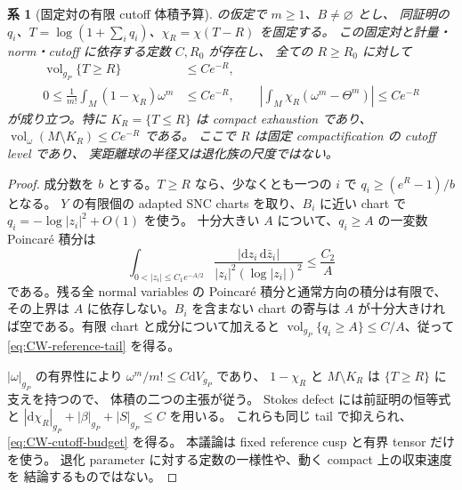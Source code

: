 \documentclass[11pt,a4paper]{ltjsarticle}
\newcommand{\dd}{\mathrm d}
\theoremstyle{plain}
\newtheorem{corollary}[corollary]{系}
\theoremstyle{definition}
\theoremstyle{remark}
\begin{document}
\begin{corollary}[固定対の有限 cutoff 体積予算]
\label{cor:CW-fixed-cutoff-budget}
 の仮定で $m\ge1$、$B\ne\varnothing$ とし、
同証明の $q_i$、$T=\log(1+\sum_iq_i)$、$\chi_R=\chi(T-R)$ を固定する。
この固定対と計量・norm・cutoff に依存する定数 $C,R_0$ が存在し、
全ての $R\ge R_0$ に対して
\begin{align}
 \operatorname{vol}_{g_P}\{T\ge R\}&\le Ce^{-R},
 \label{eq:CW-reference-tail}\\
 0\le\frac1{m!}\int_M(1-\chi_R)\omega^m&\le Ce^{-R},
 \qquad
 \left|\int_M\chi_R(\omega^m-\Theta^m)\right|\le Ce^{-R}
 \label{eq:CW-cutoff-budget}
\end{align}
が成り立つ。特に $K_R=\{T\le R\}$ は compact exhaustion であり、
$\operatorname{vol}_\omega(M\setminus K_R)\le Ce^{-R}$ である。
ここで $R$ は固定 compactification の cutoff level であり、
実距離球の半径又は退化族の尺度ではない。
\end{corollary}
\begin{proof}
成分数を $b$ とする。$T\ge R$ なら、少なくとも一つの $i$ で
$q_i\ge(e^R-1)/b$ となる。
$Y$ の有限個の adapted SNC charts を取り、$B_i$ に近い chart で
$q_i=-\log|z_i|^2+O(1)$ を使う。
十分大きい $A$ について、$q_i\ge A$ の一変数 Poincar\'e 積分は
\[
 \int_{0<|z_i|\le C_1e^{-A/2}}
 \frac{|\dd z_i\,\dd\bar z_i|}
 {|z_i|^2(\log|z_i|)^2}\le\frac{C_2}{A}
\]
である。残る全 normal variables の Poincar\'e 積分と通常方向の積分は有限で、
その上界は $A$ に依存しない。$B_i$ を含まない chart の寄与は
$A$ が十分大きければ空である。有限 chart と成分について加えると
$\operatorname{vol}_{g_P}\{q_i\ge A\}\le C/A$、従って
\eqref{eq:CW-reference-tail} を得る。

$|\omega|_{g_P}$ の有界性により $\omega^m/m!\le C\dd V_{g_P}$ であり、
$1-\chi_R$ と $M\setminus K_R$ は $\{T\ge R\}$ に支えを持つので、
体積の二つの主張が従う。
Stokes defect には前証明の恒等式と
$|\dd\chi_R|_{g_P}+|\beta|_{g_P}+|S|_{g_P}\le C$ を用いる。
これらも同じ tail で抑えられ、\eqref{eq:CW-cutoff-budget} を得る。
本議論は fixed reference cusp と有界 tensor だけを使う。
退化 parameter に対する定数の一様性や、動く compact 上の収束速度を
結論するものではない。
\end{proof}
\end{document}

